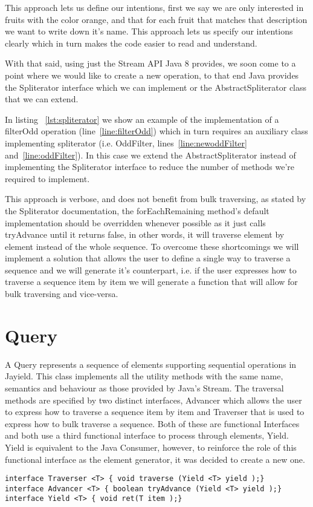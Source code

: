 

This approach lets us define our intentions, first we say we are only interested in fruits with the color orange, and that for each fruit that matches that description we want to write down it's name. This approach lets us specify our intentions clearly which in turn makes the code easier to read and understand.

With that said, using just the Stream API Java 8 provides, we soon come to a point  where we would like to create a new operation, to that end Java provides the Spliterator interface which we can implement or the AbstractSpliterator class that we can extend.


In listing ~\ref{lst:spliterator} we show an example of the implementation of a filterOdd operation (line~\ref{line:filterOdd}) which in turn requires an auxiliary class implementing spliterator (i.e. OddFilter, lines~\ref{line:newoddFilter} and~\ref{line:oddFilter}). In this case we extend the AbstractSpliterator instead of implementing the Spliterator interface to reduce the number of methods we're required to implement.

This approach is verbose, and does not benefit from bulk traversing, as stated by the Spliterator documentation, the forEachRemaining\citep{spliterator} method's default implementation should be overridden whenever possible as it just calls tryAdvance until it returns false, in other words, it will traverse element by element instead of the whole sequence. To overcome these shortcomings we will implement a solution that allows the user to define a single way to traverse a sequence and we will generate it's counterpart, i.e. if the user expresses how to traverse a sequence item by item we will generate a function that will allow for bulk traversing and vice-versa.

\section{Query}

A Query represents a sequence of elements supporting sequential operations in Jayield. This class implements all the utility methods with the same name, semantics and behaviour as those provided by Java's Stream. The traversal methods are specified by two distinct interfaces, Advancer which allows the user to express how to traverse a sequence item by item and Traverser that is used to express how to bulk traverse a sequence. Both of these are functional Interfaces and both use a third functional interface to process through elements, Yield. Yield is equivalent to the Java Consumer, however, to reinforce the role of this functional interface as the element generator, it was decided to create a new one.
\begin{lstlisting}[caption={Interfaces},captionpos=b]
interface Traverser <T> { void traverse (Yield <T> yield );}
interface Advancer <T> { boolean tryAdvance (Yield <T> yield );}
interface Yield <T> { void ret(T item );}
\end{lstlisting}

